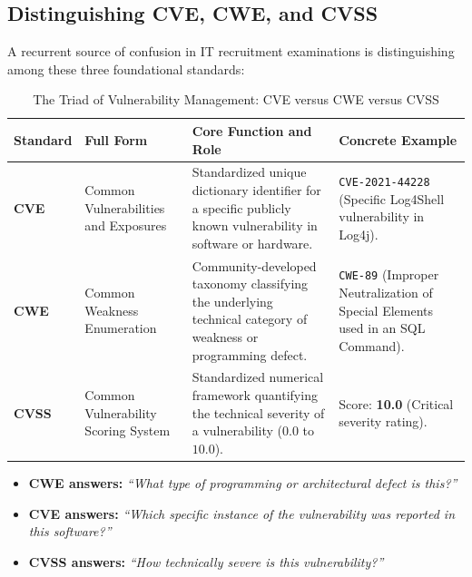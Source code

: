 \subsection{Distinguishing CVE, CWE, and CVSS}

A recurrent source of confusion in IT recruitment examinations is distinguishing among these three foundational standards:

\begin{table}[htbp]
\centering
\caption{The Triad of Vulnerability Management: CVE versus CWE versus CVSS}
\label{tab:cve_cwe_cvss}
\begin{tabularx}{\textwidth}{p{2.2cm} p{4.2cm} X X}
\toprule
\textbf{Standard} & \textbf{Full Form} & \textbf{Core Function and Role} & \textbf{Concrete Example} \\
\midrule
\textbf{CVE} & Common Vulnerabilities and Exposures & Standardized unique dictionary identifier for a specific publicly known vulnerability in software or hardware. & \texttt{CVE-2021-44228} \newline (Specific Log4Shell vulnerability in Log4j). \\
\textbf{CWE} & Common Weakness Enumeration & Community-developed taxonomy classifying the underlying technical category of weakness or programming defect. & \texttt{CWE-89} (Improper Neutralization of Special Elements used in an SQL Command). \\
\textbf{CVSS} & Common Vulnerability Scoring System & Standardized numerical framework quantifying the technical severity of a vulnerability ($0.0$ to $10.0$). & Score: \textbf{10.0} (Critical severity rating). \\
\bottomrule
\end{tabularx}
\end{table}

\begin{tcolorbox}[colback=blue!5!white,colframe=blue!60!black,title=\textbf{Exam Memory Aid: The Three Questions}]
\begin{itemize}
\item \textbf{CWE answers:} \textit{``What type of programming or architectural defect is this?''}
\item \textbf{CVE answers:} \textit{``Which specific instance of the vulnerability was reported in this software?''}
\item \textbf{CVSS answers:} \textit{``How technically severe is this vulnerability?''}
\end{itemize}
\end{tcolorbox}

